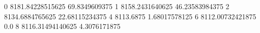 0 8181.84228515625 69.8349609375
1 8158.2431640625 46.23583984375
2 8134.6884765625 22.68115234375
4 8113.6875 1.68017578125
6 8112.00732421875 0.0
8 8116.31494140625 4.3076171875
